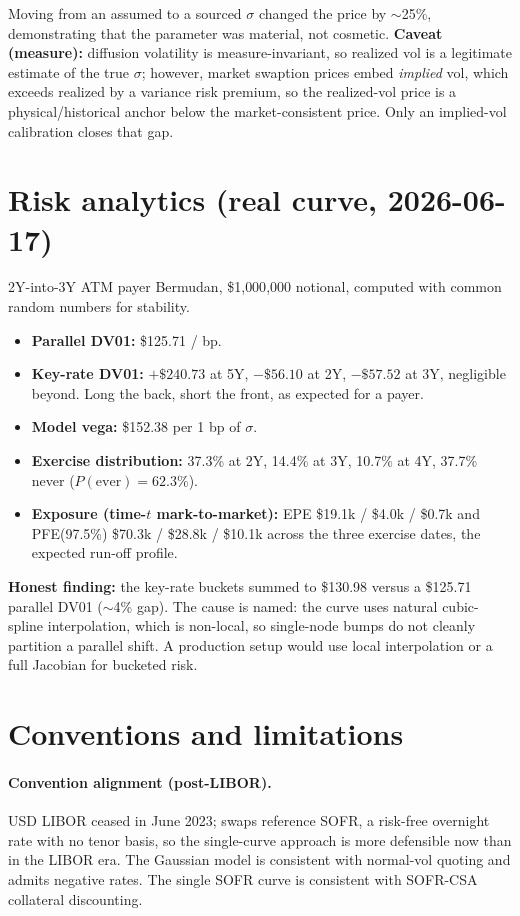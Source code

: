\documentclass[11pt]{article}
\begin{document}
\noindent Moving from an assumed to a sourced $\sigma$ changed the price by $\sim$25\%,
demonstrating that the parameter was material, not cosmetic. \textbf{Caveat (measure):}
diffusion volatility is measure-invariant, so realized vol is a legitimate estimate of the
true $\sigma$; however, market swaption prices embed \emph{implied} vol, which exceeds
realized by a variance risk premium, so the realized-vol price is a physical/historical
anchor below the market-consistent price. Only an implied-vol calibration closes that gap.

\section{Risk analytics (real curve, 2026-06-17)}

2Y-into-3Y ATM payer Bermudan, \$1{,}000{,}000 notional, computed with common random
numbers for stability.

\begin{itemize}[nosep]
  \item \textbf{Parallel DV01:} \$125.71 / bp.
  \item \textbf{Key-rate DV01:} $+\$240.73$ at 5Y, $-\$56.10$ at 2Y, $-\$57.52$ at 3Y,
        negligible beyond. Long the back, short the front, as expected for a payer.
  \item \textbf{Model vega:} \$152.38 per 1 bp of $\sigma$.
  \item \textbf{Exercise distribution:} 37.3\% at 2Y, 14.4\% at 3Y, 10.7\% at 4Y,
        37.7\% never ($P(\text{ever}) = 62.3\%$).
  \item \textbf{Exposure (time-$t$ mark-to-market):} EPE \$19.1k / \$4.0k / \$0.7k and
        PFE(97.5\%) \$70.3k / \$28.8k / \$10.1k across the three exercise dates, the
        expected run-off profile.
\end{itemize}

\noindent\textbf{Honest finding:} the key-rate buckets summed to \$130.98 versus a
\$125.71 parallel DV01 ($\sim$4\% gap). The cause is named: the curve uses natural
cubic-spline interpolation, which is non-local, so single-node bumps do not cleanly
partition a parallel shift. A production setup would use local interpolation or a full
Jacobian for bucketed risk.

\section{Conventions and limitations}

\paragraph{Convention alignment (post-LIBOR).} USD LIBOR ceased in June 2023; swaps
reference SOFR, a risk-free overnight rate with no tenor basis, so the single-curve
approach is more defensible now than in the LIBOR era. The Gaussian model is consistent
with normal-vol quoting and admits negative rates. The single SOFR curve is consistent
with SOFR-CSA collateral discounting.
\end{document}
